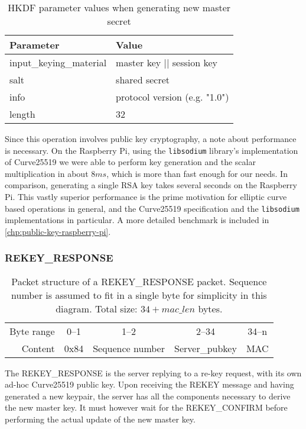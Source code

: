 \begin{table}[ht!]
\centering
    \begin{tabular}{| l | l |}
    \hline
    \textbf{Parameter} & \textbf{Value} \\ \hline
    input\_keying\_material & master key || session key \\ \hline
    salt & shared secret \\ \hline
    info & protocol version (e.g. "1.0") \\ \hline
    length & 32 \\ \hline
    \end{tabular}
    \caption{HKDF parameter values when generating new master secret}\label{tab:hkdf-rekey-parameters}
\end{table}

Since this operation involves public key cryptography, a note about performance is necessary. On the Raspberry Pi, using the \texttt{libsodium} library's implementation of Curve25519 we were able to perform key generation and the scalar multiplication in about \( 8 ms \), which is more than fast enough for our needs. In comparison, generating a single RSA key takes several seconds on the Raspberry Pi. This vastly superior performance is the prime motivation for elliptic curve based operations in general, and the Curve25519 specification and the \texttt{libsodium} implementations in particular. A more detailed benchmark is included in \autoref{chp:public-key-raspberry-pi}.


        \subsubsection{REKEY\_RESPONSE}

\begin{table}[ht!]
\centering
    \begin{tabular}{r | c | c | c | c |}
    \cline{2-5}
    Byte range & 0--1 & 1--2 & 2--34 & 34--n \\ \cline{2-5}
    Content & 0x84 & Sequence number & Server\_pubkey & MAC \\ \cline{2-5}
    \end{tabular}
    \caption{Packet structure of a REKEY\_RESPONSE packet. Sequence number is assumed to fit in a single byte for simplicity in this diagram. Total size: \( 34 + mac\_len \) bytes.}
\end{table}

The REKEY\_RESPONSE is the server replying to a re-key request, with its own ad-hoc Curve25519 public key. Upon receiving the REKEY message and having generated a new keypair, the server has all the components necessary to derive the new master key. It must however wait for the REKEY\_CONFIRM before performing the actual update of the new master key.


